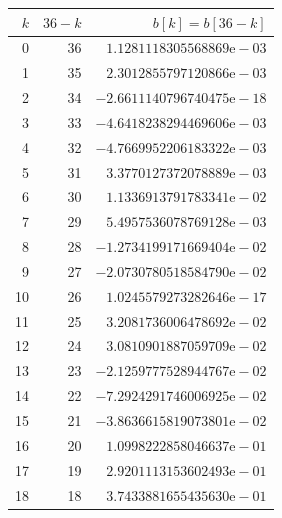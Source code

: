 \begin{tabular}{rrr}\toprule $k$ & $36-k$ & $b[k]=b[36-k]$\\\midrule
0 & 36 & $1.1281118305568869\mathrm{e}-03$\\
1 & 35 & $2.3012855797120866\mathrm{e}-03$\\
2 & 34 & $-2.6611140796740475\mathrm{e}-18$\\
3 & 33 & $-4.6418238294469606\mathrm{e}-03$\\
4 & 32 & $-4.7669952206183322\mathrm{e}-03$\\
5 & 31 & $3.3770127372078889\mathrm{e}-03$\\
6 & 30 & $1.1336913791783341\mathrm{e}-02$\\
7 & 29 & $5.4957536078769128\mathrm{e}-03$\\
8 & 28 & $-1.2734199171669404\mathrm{e}-02$\\
9 & 27 & $-2.0730780518584790\mathrm{e}-02$\\
10 & 26 & $1.0245579273282646\mathrm{e}-17$\\
11 & 25 & $3.2081736006478692\mathrm{e}-02$\\
12 & 24 & $3.0810901887059709\mathrm{e}-02$\\
13 & 23 & $-2.1259777528944767\mathrm{e}-02$\\
14 & 22 & $-7.2924291746006925\mathrm{e}-02$\\
15 & 21 & $-3.8636615819073801\mathrm{e}-02$\\
16 & 20 & $1.0998222858046637\mathrm{e}-01$\\
17 & 19 & $2.9201113153602493\mathrm{e}-01$\\
18 & 18 & $3.7433881655435630\mathrm{e}-01$\\
\bottomrule\end{tabular}
